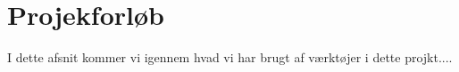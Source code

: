 \section{Projekforløb}
I dette afsnit kommer vi igennem hvad vi har brugt af værktøjer i dette projkt....


